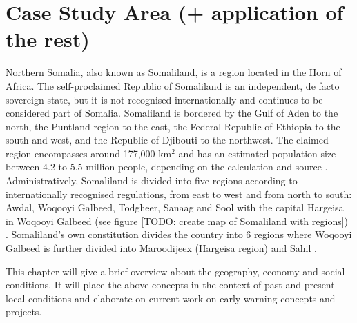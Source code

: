 


\section{Case Study Area (+ application of the rest)}\label{sec:case_area} %

Northern Somalia, also known as Somaliland, is a region located in the Horn of Africa. The self-proclaimed Republic of Somaliland is an independent, de facto sovereign state, but it is not recognised internationally and continues to be considered part of Somalia. Somaliland is bordered by the Gulf of Aden to the north, the Puntland region to the east, the Federal Republic of Ethiopia to the south and west, and the Republic of Djibouti to the northwest. The claimed region encompasses around 177,000 km$^2$ and has an estimated population size between 4.2 to 5.5 million people, depending on the calculation and source \autocite{petrucciLandscapeLandformsNorthern2022,republicofsomaliaCountryProfile20212021,somaliredcrescentsocietyFeasibilityStudyPotential2022}. Administratively, Somaliland is divided into five regions according to internationally recognised regulations, from east to west and from north to south: Awdal, Woqooyi Galbeed, Todgheer, Sanaag and Sool with the capital Hargeisa in Woqooyi Galbeed (see figure \ref{TODO: create map of Somaliland with regions}) \autocite{republicofsomaliaCountryProfile20212021}. Somaliland's own constitution divides the country into 6 regions where Woqooyi Galbeed is further divided into Maroodijeex (Hargeisa region) and Sahil \autocite{republicofsomalilandRegionsDistrictsSelfmanagement2019}.


This chapter will give a brief overview about the geography, economy and social conditions. It will place the above concepts in the context of past and present local conditions and elaborate on current work on early warning concepts and projects. 


